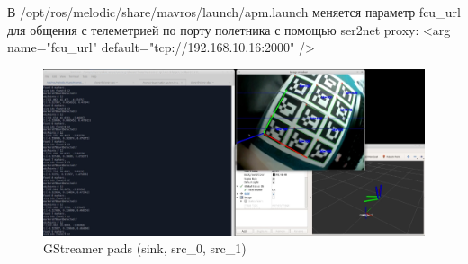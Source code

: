В /opt/ros/melodic/share/mavros/launch/apm.launch меняется параметр fcu\_url для общения с телеметрией по порту полетника с помощью ser2net proxy:
<arg name="fcu\_url" default="tcp://192.168.10.16:2000" />
\begin{figure}[H]
	\centering
	\includegraphics[width=0.9\linewidth]{pics/px4}
	\caption{ GStreamer pads (sink, src\_0, src\_1)
	}
	\label{fig:px4}
\end{figure}
